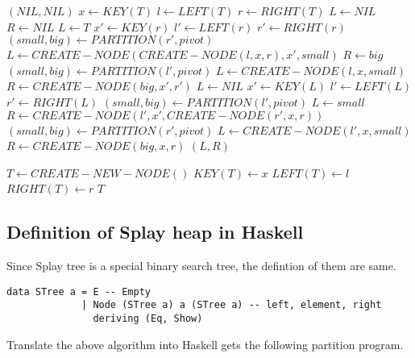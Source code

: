 \documentclass{article}
\begin{document}
\begin{algorithmic}[1]
    \State \Return $(NIL, NIL)$
  \EndIf
  \State $x \gets KEY(T)$
  \State $l \gets LEFT(T)$
  \State $r \gets RIGHT(T)$
  \State $L \gets NIL$
  \State $R \gets NIL$
      \State $L \gets T$
    \Else
      \State $x' \gets KEY(r)$
      \State $l' \gets LEFT(r)$
      \State $r' \gets RIGHT(r)$
        \State $(small, big) \gets PARTITION(r', pivot)$
        \State $L \gets CREATE-NODE(CREATE-NODE(l, x, r), x', small)$
        \State $R \gets big$
      \Else
        \State $(small, big) \gets PARTITION(l', pivot)$
        \State $L \gets CREATE-NODE(l, x, small)$
        \State $R \gets CREATE-NODE(big, x', r')$
      \EndIf
    \EndIf
  \Else
      \State $L \gets NIL$
    \Else
      \State $x' \gets KEY(L)$
      \State $l' \gets LEFT(L)$
      \State $r' \gets RIGHT(L)$
        \State $(small, big) \gets PARTITION(l', pivot)$
        \State $L \gets small$
        \State $R \gets CREATE-NODE(l', x', CREATE-NODE(r', x, r))$
      \Else
        \State $(small, big) \gets PARTITION(r', pivot)$
        \State $L \gets CREATE-NODE(l', x, small)$
        \State $R \gets CREATE-NODE(big, x, r)$
      \EndIf
    \EndIf
  \EndIf
  \State \Return $(L, R)$
\EndFunction

  \State $T \gets CREATE-NEW-NODE()$
  \State $KEY(T) \gets x$
  \State $LEFT(T) \gets l$
  \State $RIGHT(T) \gets r$
  \State \Return $T$
\EndFunction
\end{algorithmic}

\subsection*{Definition of Splay heap in Haskell}

Since Splay tree is a special binary search tree, the defintion of
them are same.

\lstset{language=Haskell}
\begin{lstlisting}
data STree a = E -- Empty
             | Node (STree a) a (STree a) -- left, element, right
               deriving (Eq, Show)
\end{lstlisting}

Translate the above algorithm into Haskell gets the following partition
program.
\end{document}
